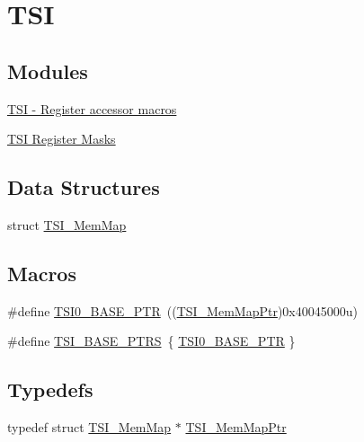 \hypertarget{group___t_s_i___peripheral}{}\section{T\+SI}
\label{group___t_s_i___peripheral}
\subsection*{Modules}
\begin{DoxyCompactItemize}
\item 
\hyperlink{group___t_s_i___register___accessor___macros}{T\+S\+I -\/ Register accessor macros}
\item 
\hyperlink{group___t_s_i___register___masks}{T\+S\+I Register Masks}
\end{DoxyCompactItemize}
\subsection*{Data Structures}
\begin{DoxyCompactItemize}
\item 
struct \hyperlink{struct_t_s_i___mem_map}{T\+S\+I\+\_\+\+Mem\+Map}
\end{DoxyCompactItemize}
\subsection*{Macros}
\begin{DoxyCompactItemize}
\item 
\#define \hyperlink{group___t_s_i___peripheral_gaf98ea1cd15559446e0cfc1ae177751f6}{T\+S\+I0\+\_\+\+B\+A\+S\+E\+\_\+\+P\+TR}~((\hyperlink{group___t_s_i___peripheral_gad1310fedc6b594554cdd760e371de570}{T\+S\+I\+\_\+\+Mem\+Map\+Ptr})0x40045000u)
\item 
\#define \hyperlink{group___t_s_i___peripheral_gaf0e643a8dc882d5a89dd6bb9a4ca3d16}{T\+S\+I\+\_\+\+B\+A\+S\+E\+\_\+\+P\+T\+RS}~\{ \hyperlink{group___t_s_i___peripheral_gaf98ea1cd15559446e0cfc1ae177751f6}{T\+S\+I0\+\_\+\+B\+A\+S\+E\+\_\+\+P\+TR} \}
\end{DoxyCompactItemize}
\subsection*{Typedefs}
\begin{DoxyCompactItemize}
\item 
typedef struct \hyperlink{struct_t_s_i___mem_map}{T\+S\+I\+\_\+\+Mem\+Map} $\ast$ \hyperlink{group___t_s_i___peripheral_gad1310fedc6b594554cdd760e371de570}{T\+S\+I\+\_\+\+Mem\+Map\+Ptr}
\end{DoxyCompactItemize}


